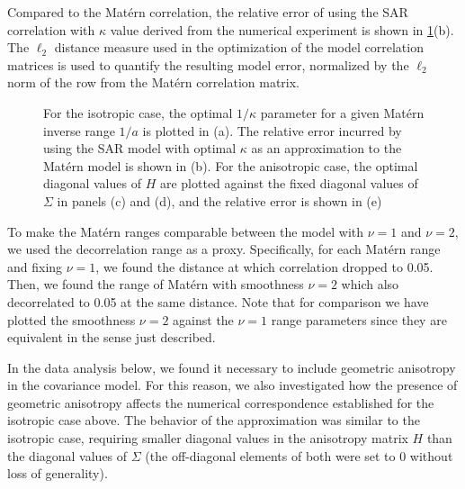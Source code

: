\documentclass[review]{elsarticle}
\begin{document}
Compared to the Mat\'ern correlation, the relative error of using the SAR correlation with $\kappa$ value derived from the numerical experiment is shown in \ref{f:1}(b). The $\ell_2$ distance measure used in the optimization of the model correlation matrices is used to quantify the resulting model error, normalized by the $\ell_2$ norm of the row from the Mat\'ern correlation matrix.




\begin{figure}
    \centering
    \caption{For the isotropic case, the optimal $1/ \kappa$ parameter for a given Mat\'ern inverse range $1/a$ is plotted in (a). The relative error incurred by using the SAR model with optimal $\kappa$ as an approximation to the Mat\'ern model is shown in (b). For the anisotropic case, the optimal diagonal values of $H$ are plotted against the fixed diagonal values of $\Sigma$ in panels (c) and (d), and the relative error is shown in (e)}
    \label{f:1}
\end{figure}


To make the Mat\'ern ranges comparable between the model with $\nu=1$ and $\nu=2$, we used the decorrelation range as a proxy. Specifically, for each Mat\'ern range and fixing $\nu=1$, we found the distance at which correlation dropped to 0.05. Then, we found the range of Mat\'ern with smoothness $\nu=2$ which also decorrelated to 0.05 at the same distance. Note that for comparison we have plotted the smoothness $\nu=2$ against the $\nu=1$ range parameters since they are equivalent in the sense just described.

In the data analysis below, we found it necessary to include geometric anisotropy in the covariance model. For this reason, we also investigated how the presence of geometric anisotropy affects the numerical correspondence established for the isotropic case above. The behavior of the approximation was similar to the isotropic case, requiring smaller diagonal values in the anisotropy matrix $H$ than the diagonal values of $\Sigma$ (the off-diagonal elements of both were set to 0 without loss of generality). 
\end{document}
